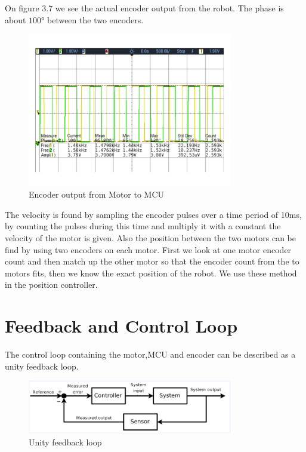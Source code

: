 On figure 3.7 we see the actual encoder output from the robot. The phase is about $\ang{100}$ between the two encoders.
  \begin{figure}[!h!]
	\centering
	\includegraphics[width=0.8\textwidth]{resources/Scop/encoder.png}
	\caption{Encoder output from Motor to MCU}
	\label{fig:6}
\end{figure}
The velocity is found by sampling the encoder pulses over a time period of 10ms, by counting the pulses during this time and multiply it with a constant the velocity of the motor is given.
Also the position between the two motors can be find by using two encoders on each motor. First we look at one motor encoder count and then match up the other motor so that the encoder count from the to motors fits, then we know the exact position of the robot. We use these method in the position controller.    
\newpage

\section{Feedback and Control Loop}
The control loop containing the motor,MCU and encoder can be described as a unity feedback loop.


  \begin{figure}[!h!]
	\centering
	\includegraphics[width=0.8\textwidth]{resources/feedbackloop.png}
	\caption{Unity feedback loop}
	\label{fig:6}
\end{figure}





